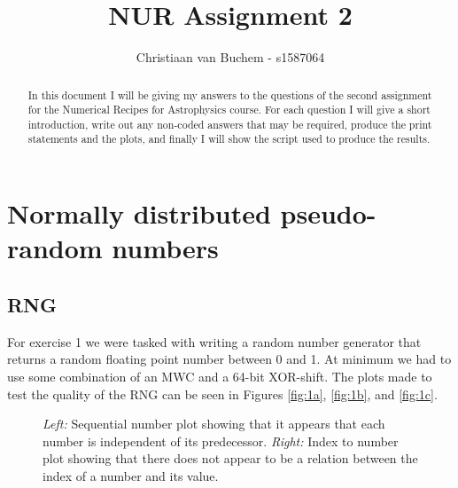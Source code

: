 \documentclass[a4paper,10pt]{article}
\title{NUR Assignment 2}
\author{Christiaan van Buchem - s1587064}
\begin{document}
\maketitle

\begin{abstract}
 In this document I will be giving my answers to the questions of the second assignment for the Numerical Recipes for Astrophysics course. For each question I will give a short introduction, write out any non-coded answers that may be required, produce the print statements and the plots, and finally I will show the script used to produce the results.  
\end{abstract}

\section{Normally distributed pseudo-random numbers}

\subsection{RNG}

For exercise 1 we were tasked with writing a random number generator that returns a random floating point number between 0 and 1. At minimum we had to use some combination of an MWC and a 64-bit XOR-shift. The plots made to test the quality of the RNG can be seen in Figures \ref{fig:1a}, \ref{fig:1b}, and \ref{fig:1c}.


\begin{figure}[h!] 
	\begin{center}
	\end{center}
	\captionsetup{width=0.8\linewidth}
	\vspace*{-7mm} %
	\caption{\textit{Left:} Sequential number plot showing that it appears that each number is independent of its predecessor. \textit{Right:} Index to number plot showing that there does not appear to be a relation between the index of a number and its value.}
	\label{fig:1ab}
\end{figure}
\end{document}
